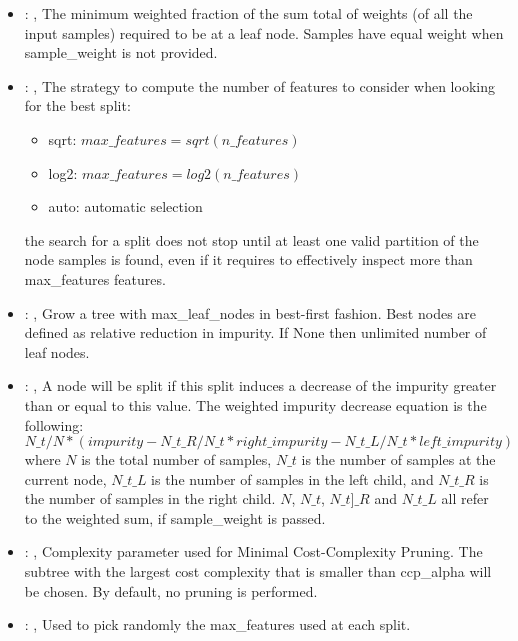 \begin{itemize}
    \item {}: , 
      The minimum weighted fraction of the sum total of weights (of all the input samples)
      required to be at a leaf node. Samples have equal weight when sample\_weight is not provided.

    \item {}: , 
      The strategy to compute the number of features to consider when looking for the best split:
      \begin{itemize}                                                     \item sqrt:
      $max\_features=sqrt(n\_features)$                                                     \item
      log2: $max\_features=log2(n\_features)$
      \item auto: automatic selection
      \end{itemize}                                                   \nb the search for a split
      does not stop until at least one valid partition of the node
      samples is found, even if it requires to effectively inspect more than max\_features features.

    \item {}: , 
      Grow a tree with max\_leaf\_nodes in best-first fashion. Best nodes are defined as relative
      reduction                                                  in impurity. If None then unlimited
      number of leaf nodes.

    \item {}: , 
      A node will be split if this split induces a decrease of the impurity greater than or equal to
      this value.                                                  The weighted impurity decrease
      equation is the following:                                                  $N\_t / N *
      (impurity - N\_t\_R / N\_t * right\_impurity - N\_t\_L / N\_t * left\_impurity)$
      where $N$ is the total number of samples, $N\_t$ is the number of samples at the current node,
      $N\_t\_L$ is the number                                                  of samples in the
      left child, and $N\_t\_R$ is the number of samples in the right child.
      $N$, $N\_t$, $N\_t]\_R$ and $N\_t\_L$ all refer to the weighted sum, if sample\_weight is
      passed.

    \item {}: , 
      Complexity parameter used for Minimal Cost-Complexity Pruning. The subtree with the largest
      cost                                                  complexity that is smaller than
      ccp\_alpha will be chosen. By default, no pruning is performed.

    \item {}: , 
      Used to pick randomly the max\_features used at each split.
  \end{itemize}
